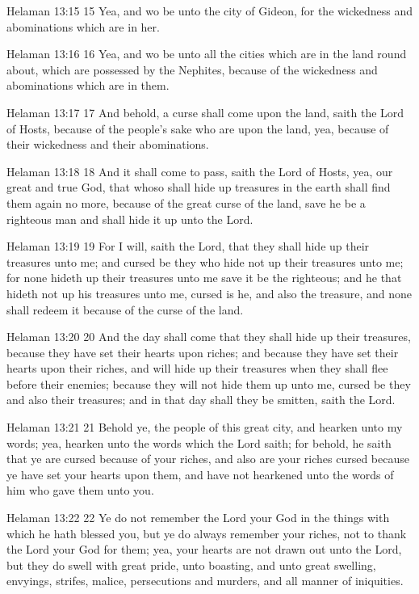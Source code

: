 Helaman 13:15
 15 Yea, and wo be unto the city of Gideon, for the wickedness
and abominations which are in her.

Helaman 13:16
 16 Yea, and wo be unto all the cities which are in the land
round about, which are possessed by the Nephites, because of the
wickedness and abominations which are in them.

Helaman 13:17
 17 And behold, a curse shall come upon the land, saith the Lord
of Hosts, because of the people's sake who are upon the land,
yea, because of their wickedness and their abominations.

Helaman 13:18
 18 And it shall come to pass, saith the Lord of Hosts, yea, our
great and true God, that whoso shall hide up treasures in the
earth shall find them again no more, because of the great curse
of the land, save he be a righteous man and shall hide it up unto
the Lord.

Helaman 13:19
 19 For I will, saith the Lord, that they shall hide up their
treasures unto me; and cursed be they who hide not up their
treasures unto me; for none hideth up their treasures unto me
save it be the righteous; and he that hideth not up his treasures
unto me, cursed is he, and also the treasure, and none shall
redeem it because of the curse of the land.

Helaman 13:20
 20 And the day shall come that they shall hide up their
treasures, because they have set their hearts upon riches; and
because they have set their hearts upon their riches, and will
hide up their treasures when they shall flee before their
enemies; because they will not hide them up unto me, cursed be
they and also their treasures; and in that day shall they be
smitten, saith the Lord.

Helaman 13:21
 21 Behold ye, the people of this great city, and hearken unto my
words; yea, hearken unto the words which the Lord saith; for
behold, he saith that ye are cursed because of your riches, and
also are your riches cursed because ye have set your hearts upon
them, and have not hearkened unto the words of him who gave them
unto you.

Helaman 13:22
 22 Ye do not remember the Lord your God in the things with which
he hath blessed you, but ye do always remember your riches, not
to thank the Lord your God for them; yea, your hearts are not
drawn out unto the Lord, but they do swell with great pride, unto
boasting, and unto great swelling, envyings, strifes, malice,
persecutions and murders, and all manner of iniquities.

